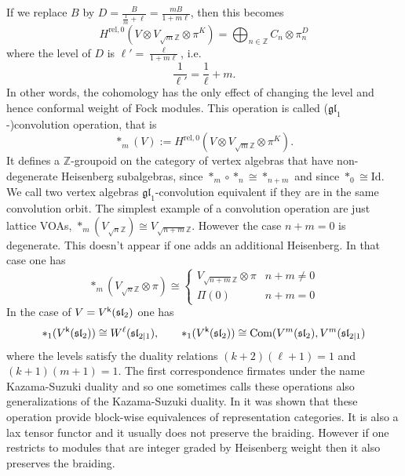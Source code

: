 \documentclass[a4paper, reqno]{amsart}
\theoremstyle{introTheorems}
\renewcommand{\1}{\mathbbold{1}}
\begin{document}
If we replace $B$ by $D = \frac{B}{\frac{1}{m}+\ell}= \frac{mB}{1+m\ell}$, then this becomes
\[
H^{\mathrm{rel},0}(V \otimes V_{\sqrt{m}\mathbb Z} \otimes \pi^{K}) =
\bigoplus_{n\in \mathbb Z} C_{n} \otimes \pi^D_{n}
\]
where the level of $D$ is $\ell' = \frac{\ell}{1+m\ell}$, i.e.
\[
 \frac{1}{\ell'} = \frac{1}{\ell} + m.
\]
In other words, the cohomology has the only effect of changing the level and hence conformal weight of Fock modules. 
This operation is called ($\mathfrak{gl}_1$-)convolution operation, that is
\[
*_m(V):= H^{\mathrm{rel},0}(V \otimes V_{\sqrt{m}\mathbb Z} \otimes \pi^{K}).
\]
It defines a $\mathbb Z$-groupoid on the category of vertex algebras that have non-degenerate Heisenberg subalgebras, since $*_m \circ *_n \cong  *_{n+m}$ and since $*_0 \cong \text{Id}$.
We call two vertex algebras $\mathfrak{gl}_1$-convolution equivalent if they are in the same convolution orbit. 
The simplest example of a convolution operation are just lattice VOAs, $*_m (V_{\sqrt{n}\mathbb Z}) \cong V_{\sqrt{n+m}\mathbb Z}$. However the case $n+m =0$ is degenerate. This doesn't appear if one adds an additional Heisenberg. In that case one has 
\[
*_m (V_{\sqrt{n}\mathbb Z} \otimes \pi) \cong  \begin{cases} V_{\sqrt{n+m}\mathbb Z} \otimes \pi & n+m \neq 0 \\
\Pi(0) & n+m =0
\end{cases}
\]
In the case of $V = V^{\mathsf{k}}(\mathfrak{sl}_2)$ one has 
\[
*_1(V^{\mathsf{k}}(\mathfrak{sl}_2)) \cong W^\ell(\mathfrak{sl}_{2|1}), \qquad
*_1(V^{\mathsf{k}}(\mathfrak{sl}_2)) \cong \text{Com}(V^m(\mathfrak{sl}_2), V^m(\mathfrak{sl}_{2|1})
\]
where the levels satisfy the duality relations $(k+2)(\ell+1)=1$ and $(k+1)(m+1)=1$.
The first correspondence firmates under the name Kazama-Suzuki duality and so one sometimes calls these operations also generalizations of the Kazama-Suzuki duality.
In \cite{CGNS} it was shown that these operation provide block-wise equivalences of representation categories. It is also a lax tensor functor and it usually does not preserve the braiding. However if one restricts to modules that are integer graded by Heisenberg weight then it also preserves the braiding. 
\end{document}

